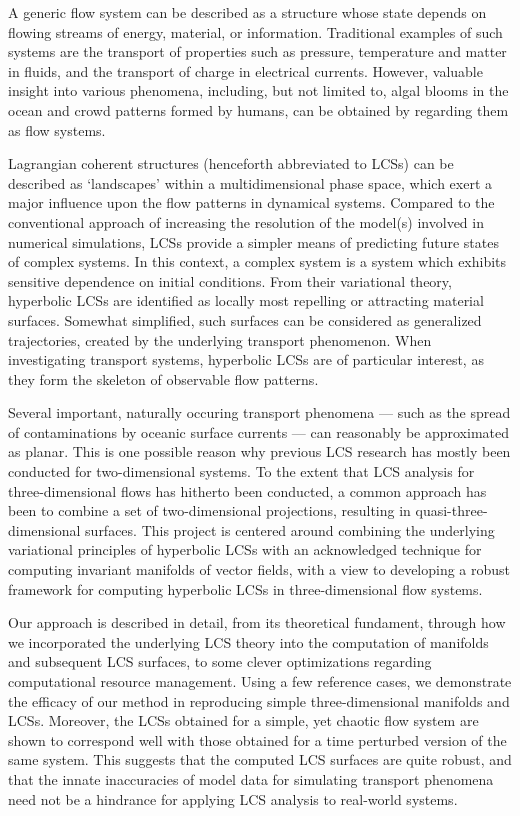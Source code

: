 A generic flow system can be described as a structure whose state depends on
flowing streams of energy, material, or information. Traditional examples of
such systems are the transport of properties such as pressure, temperature and
matter in fluids, and the transport of charge in electrical currents. However,
valuable insight into various phenomena, including, but not limited to, algal
blooms in the ocean and crowd patterns formed by humans, can be obtained by
regarding them as flow systems.

Lagrangian coherent structures (henceforth abbreviated to LCSs) can be
described as `landscapes' within a multidimensional phase space, which exert a
major influence upon the flow patterns in dynamical systems. Compared to the
conventional approach of increasing the resolution of the model(s) involved in
numerical simulations, LCSs provide a simpler means of predicting future states
of complex systems. In this context, a complex system is a system which
exhibits sensitive dependence on initial conditions. From their variational
theory, hyperbolic LCSs are identified as locally most repelling or attracting
material surfaces. Somewhat simplified, such surfaces can be considered as
generalized trajectories, created by the underlying transport phenomenon. When
investigating transport systems, hyperbolic LCSs are of particular interest, as
they form the skeleton of observable flow patterns.

Several important, naturally occuring transport phenomena --- such as the
spread of contaminations by oceanic surface currents --- can reasonably be
approximated as planar. This is one possible reason why previous
LCS research has mostly been conducted for two-dimensional systems. To the
extent that LCS analysis for three-dimensional flows has hitherto been
conducted, a common approach has been to combine a set of two-dimensional
projections, resulting in quasi-three-dimensional surfaces. This project is
centered around combining the underlying variational principles of hyperbolic
LCSs with an acknowledged technique for computing invariant manifolds of vector
fields, with a view to developing a robust framework for computing hyperbolic
LCSs in three-dimensional flow systems.

Our approach is described in detail, from its theoretical fundament, through
how we incorporated the underlying LCS theory into the computation of manifolds
and subsequent LCS surfaces, to some clever optimizations regarding
computational resource management. Using a few reference cases, we demonstrate
the efficacy of our method in reproducing simple three-dimensional manifolds
and LCSs. Moreover, the LCSs obtained for a simple, yet chaotic flow
system are shown to correspond well with those obtained for a time perturbed
version of the same system. This suggests that the computed LCS surfaces are
quite robust, and that the innate inaccuracies of model data for simulating
transport phenomena need not be a hindrance for applying LCS analysis to
real-world systems.

